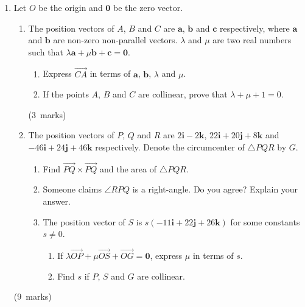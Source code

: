 \documentclass[12pt, a4paper]{article} %
\newcommand{\qmarks}[1]{\leavevmode\unskip\hspace*{\fill}\mbox{(#1 marks)}}
\begin{document}
\begin{enumerate}
    \item Let \(O\) be the origin and \(\mathbf{0}\) be the zero vector.
    \begin{enumerate}
        \item The position vectors of \(A\), \(B\) and \(C\) are \(\mathbf{a}\), \(\mathbf{b}\) and \(\mathbf{c}\) respectively, where \(\mathbf{a}\) and \(\mathbf{b}\) are non-zero non-parallel vectors. \(\lambda\) and \(\mu\) are two real numbers such that \(\lambda \mathbf{a}+\mu \mathbf{b}+\mathbf{c}=\mathbf{0}\).
        \begin{enumerate}[label=(\roman*)]
            \item Express \(\overrightarrow{CA}\) in terms of \(\mathbf{a}\), \(\mathbf{b}\), \(\lambda\) and \(\mu\).
            \item If the points \(A\), \(B\) and \(C\) are collinear, prove that \(\lambda+\mu+1=0\).
        \end{enumerate}\qmarks{3}
        \item The position vectors of \(P\), \(Q\) and \(R\) are \(2\mathbf{i}-2\mathbf{k}\), \(22\mathbf{i}+20\mathbf{j}+8\mathbf{k}\) and\\
        \(-46\mathbf{i}+24\mathbf{j}+46\mathbf{k}\) respectively. Denote the circumcenter of \(\triangle PQR\) by \(G\).
        \begin{enumerate}[label=(\roman*)]
            \item Find \(\overrightarrow{PQ} \times \overrightarrow{PQ}\) and the area of \(\triangle PQR\).
            \item Someone claims \(\angle RPQ\) is a right-angle. Do you agree? Explain your answer.
            \item The position vector of \(S\) is \(s(-11\mathbf{i}+22\mathbf{j}+26\mathbf{k})\) for some constants \(s \neq 0\).
            \begin{enumerate}[label=(\arabic*)]
                \item If \(\lambda \overrightarrow{OP}+\mu \overrightarrow{OS}+\overrightarrow{OG}=\mathbf{0}\), express \(\mu\) in terms of \(s\).
                \item Find \(s\) if \(P\), \(S\) and \(G\) are collinear.
            \end{enumerate}
        \end{enumerate}
    \end{enumerate}\qmarks{9}


\end{enumerate}
\end{document}
